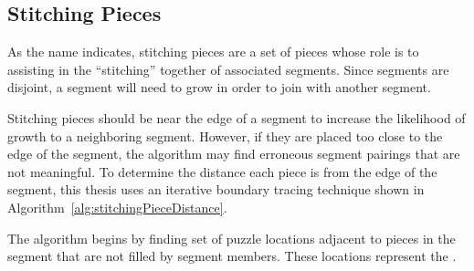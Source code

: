 \subsection{Stitching Pieces}

As the name indicates, stitching pieces are a set of pieces whose role is to assisting in the ``stitching'' together of associated segments.  Since segments are disjoint, a segment will need to grow in order to join with another segment.  

Stitching pieces should be near the edge of a segment to increase the likelihood of growth to a neighboring segment.  However,  if they are placed too close to the edge of the segment, the algorithm may find erroneous segment pairings that are not meaningful.  To determine the distance each piece is from the edge of the segment, this thesis uses an iterative boundary tracing technique shown in Algorithm~\ref{alg:stitchingPieceDistance}.

The algorithm begins by finding set of puzzle locations adjacent to pieces in the segment that are not filled by segment members.  These locations represent the .

